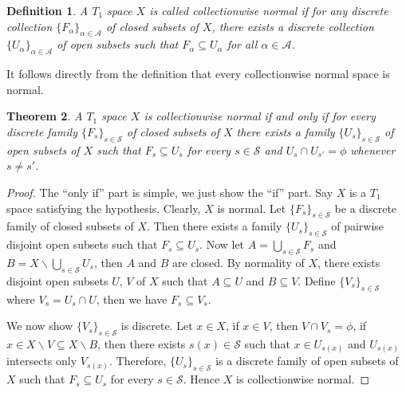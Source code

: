 \documentclass[12pt,oneside,english]{amsbook}
\numberwithin{equation}{section} %
\numberwithin{figure}{section} %
\theoremstyle{plain}
\numberwithin{section}{chapter}
\newtheorem{thm}{Theorem}[section]
\theoremstyle{plain}
\newtheorem{defn}[thm]{Definition}
\begin{document}


\begin{defn}
  A $T_{1}$ space $X$ is called collectionwise normal if for any discrete collection $\{F_{\alpha}\}_{\alpha \in \mathcal{A}}$ of closed subsets of $X$, there exists a discrete collection $\{U_{\alpha}\}_{\alpha \in \mathcal{A}}$ of open subsets such that $F_{\alpha} \subseteq U_{\alpha}$ for all $\alpha \in \mathcal{A}$. 
\end{defn}

It follows directly from the definition that every collectionwise normal space is normal.

\begin{thm}
  A $T_1$ space $X$ is collectionwise normal if and only if for every discrete family $\{F_s\}_{s \in \mathcal{S}}$ of closed subsets of $X$ there exists a family $\{U_s\}_{s \in \mathcal{S}}$ of open subsets of $X$ such that $F_s \subseteq U_s$ for every $s \in \mathcal{S}$ and $U_s \cap U_{s'} = \phi$ whenever $s \neq s'$.
\end{thm}
\begin{proof}
 The ``only if'' part is simple, we just show the ``if'' part. Say $X$ is a $T_1$ space satisfying the hypothesis. Clearly, $X$ is normal. Let $\{F_s\}_{s \in \mathcal{S}}$ be a discrete family of closed subsets of $X$. Then there exists a family $\{U_s\}_{s \in \mathcal{S}}$ of pairwise disjoint open subsets such that $F_s \subseteq U_s$. Now let $A = \bigcup_{s \in \mathcal{S}}F_s$ and $B = X \backslash \bigcup_{s \in \mathcal{S}}U_s$, then $A$ and $B$ are closed. By normality of $X$, there exists disjoint open subsets $U$, $V$ of $X$ such that $A \subseteq U$ and $B \subseteq V$. Define $\{V_s\}_{s \in \mathcal{S}}$ where $V_s = U_s \cap U$, then we have $F_s \subseteq V_s$.

  We now show $\{V_s\}_{s \in \mathcal{S}}$ is discrete. Let $x \in X$, if $x \in V$, then $V \cap V_s = \phi$, if $x \in X \backslash V \subseteq X \backslash B$, then there exists $s(x) \in \mathcal{S}$ such that $x \in U_{s(x)}$ and $U_{s(x)}$ intersects only $V_{s(x)}$. Therefore, $\{U_s\}_{s \in \mathcal{S}}$ is a discrete family of open subsets of $X$ such that $F_s \subseteq U_s$ for every $s \in \mathcal{S}$. Hence $X$ is collectionwise normal.
\end{proof}
\end{document}
